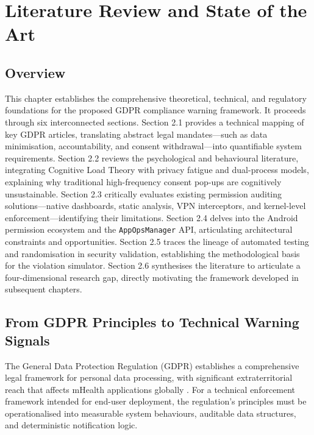 \newpage
\section{Literature Review and State of the Art}

\subsection{Overview}

This chapter establishes the comprehensive theoretical, technical, and regulatory foundations for the proposed GDPR compliance warning framework. It proceeds through six interconnected sections. Section 2.1 provides a technical mapping of key GDPR articles, translating abstract legal mandates—such as data minimisation, accountability, and consent withdrawal—into quantifiable system requirements. Section 2.2 reviews the psychological and behavioural literature, integrating Cognitive Load Theory with privacy fatigue and dual-process models, explaining why traditional high-frequency consent pop-ups are cognitively unsustainable. Section 2.3 critically evaluates existing permission auditing solutions—native dashboards, static analysis, VPN interceptors, and kernel-level enforcement—identifying their limitations. Section 2.4 delves into the Android permission ecosystem and the \texttt{AppOpsManager} API, articulating architectural constraints and opportunities. Section 2.5 traces the lineage of automated testing and randomisation in security validation, establishing the methodological basis for the violation simulator. Section 2.6 synthesises the literature to articulate a four-dimensional research gap, directly motivating the framework developed in subsequent chapters.

\subsection{From GDPR Principles to Technical Warning Signals}

The General Data Protection Regulation (GDPR) establishes a comprehensive legal framework for personal data processing, with significant extraterritorial reach that affects mHealth applications globally \cite{1}. For a technical enforcement framework intended for end-user deployment, the regulation's principles must be operationalised into measurable system behaviours, auditable data structures, and deterministic notification logic.

